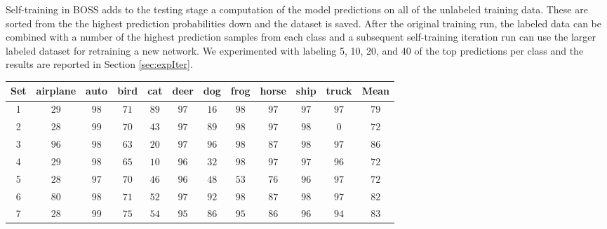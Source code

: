 \documentclass[final]{cvpr}
\newcommand{\FM}{FixMatch }
\begin{document}
Self-training in BOSS adds to the testing stage a computation of the model predictions on all of the unlabeled training data.  
These are sorted from the the highest prediction probabilities down and the dataset is saved.
After the original training run, the labeled data can be combined with a number of the highest prediction samples from each class and a subsequent self-training iteration run can use the larger labeled dataset for retraining a new network.
We experimented with labeling 5, 10, 20, and 40 of the top predictions per class and the results are reported in Section \ref{sec:expIter}.




\begin{table*}
	\begin{center}
		\begin{tabular}{|c|c|c|c|c|c|c|c|c|c|c|c|}
			\hline
			Set & airplane & auto & bird & cat & deer & dog & frog & horse & ship & truck & Mean \\
			\hline\hline
1 & $ 29 $  & $ 98 $  & $ 71 $  & $ 89 $  & $ 97 $  & $ 16 $  & $ 98 $  & $ 97 $  & $ 97 $  & $ 97 $ & $ 79 $ \\
			\hline
			2 & $ 28 $  & $ 99 $  & $ 70 $  & $ 43 $  & $ 97 $  & $ 89 $  & $ 98 $  & $ 97 $  & $ 98 $  & $ 0 $   & $ 72 $ \\
			\hline
			3 & $96 $  & $ 98 $  & $ 63 $  & $ 20 $  & $ 97 $  & $ 96 $  & $ 98 $  & $ 87 $  & $ 98 $  & $ 97 $   & $ 86 $ \\
			\hline
			4 & $ 29 $  & $ 98 $  & $ 65 $  & $ 10 $  & $ 96 $  & $ 32 $  & $ 98 $  & $ 97 $  & $ 97 $  & $ 96 $  & $ 72 $  \\
			\hline
			5 & $ 28 $  & $ 97 $  & $ 70 $  & $ 46 $  & $ 96 $  & $ 48 $  & $ 53 $  & $ 76 $  & $ 96 $  & $ 97 $  & $ 72 $  \\
			\hline
			6 & $ 80 $  & $ 98 $  & $ 71 $  & $ 52 $  & $ 97 $  & $ 92 $  & $ 98 $  & $ 87 $  & $ 98 $  & $ 97 $  & $ 82 $  \\
\hline
			7 & $ 28 $  & $ 99 $  & $ 75 $  & $ 54 $  & $ 95 $  & $ 86 $  & $ 95 $  & $ 86 $  & $ 96 $  & $ 94 $  & $ 83 $  \\
			\hline		
		\end{tabular}
	\end{center}
	\caption{\textbf{Class accuracies.} One-shot semi-supervised average (of 2 runs) class accuracies for Cifar-10 test data with the \FM model, that was trained on sets of manually chosen prototypes for each class.  Prototype set 6 was modified from set 2 and prototype set 7 was modified from set 4 (i.e., prototype refining).
	}
	\label{tab:classAcc1}
\end{table*}
\end{document}
